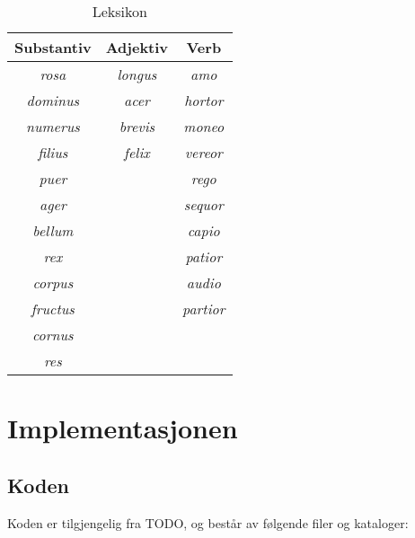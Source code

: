 \documentclass{article}
\newcommand\note[1]{\marginpar{\raggedright\tiny#1}}
\newcommand\w[1]{\emph{#1}}
\begin{document}
\begin{table}
\begin{center}
\begin{tabular}{|ccc|}
    \hline
Substantiv  & Adjektiv   & Verb \\
    \hline
\w{rosa}    & \w{longus} & \w{amo}     \\
\w{dominus} & \w{acer}   & \w{hortor}  \\
\w{numerus} & \w{brevis} & \w{moneo}   \\
\w{filius}  & \w{felix}  & \w{vereor}  \\
\w{puer}    &            & \w{rego}    \\
\w{ager}    &            & \w{sequor}  \\
\w{bellum}  &            & \w{capio}   \\
\w{rex}     &            & \w{patior}  \\
\w{corpus}  &            & \w{audio}   \\
\w{fructus} &            & \w{partior} \\
\w{cornus}  &            &             \\
\w{res}     &            &             \\
    \hline
\end{tabular}
\end{center}
\caption{Leksikon}
\label{leksikon}
\end{table}

\section{Implementasjonen}
\subsection{Koden}
Koden er tilgjengelig fra TODO, og best\aa{}r av f\o{}lgende filer og
kataloger:
\end{document}
